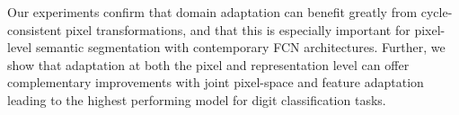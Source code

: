 Our experiments confirm  that domain adaptation can benefit greatly from cycle-consistent pixel transformations, and that this is especially important for pixel-level semantic segmentation with contemporary FCN architectures. Further, we show that adaptation at both the pixel and representation level can offer complementary improvements with joint pixel-space and feature adaptation leading to the highest performing model for digit classification tasks. 

\begin{table}[t]
\caption{Our model, CyCADA, may use pixel, feature, and semantic information during adaptation while learning an invertible mapping through cycle consistency. }
\label{table:compare-methods}
\end{table}

